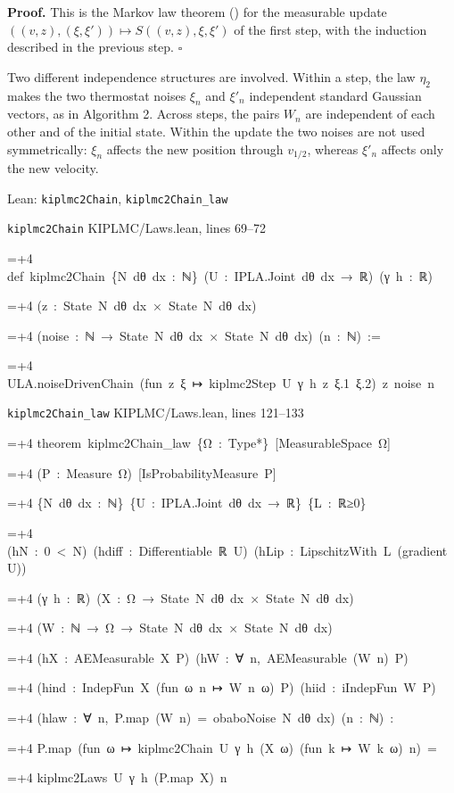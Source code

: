 \documentclass[11pt,a4paper]{article}
\newlength{\leancharwidth}
\newenvironment{leancode}{\par\smallskip\begingroup\ttfamily\footnotesize\raggedright
  \settowidth{\leancharwidth}{M}\setlength{\parskip}{0pt}\setlength{\parindent}{0pt}
  \frenchspacing}{\par\endgroup\smallskip}
\newcommand{\leanline}[2]{\hangindent=\dimexpr#1\leancharwidth+4\leancharwidth\relax
  \hangafter=1\noindent\hspace*{#1\leancharwidth}#2\par}
\newcommand{\leansource}[1]{\par{\footnotesize\color{leanmuted}#1}\par}
\begin{document}
\textbf{Proof.} This is the Markov law theorem (\cite[Section~3.33.12]{LangevinLean2026ULASC}) for the measurable update \(((v,z),(\xi,\xi'))\mapsto S((v,z),\xi,\xi')\) of the first step, with the induction described in the previous step. \(\square\)




Two different independence structures are involved. Within a step, the law \(\eta_2\) makes the two thermostat noises \(\xi_n\) and \(\xi'_n\) independent standard Gaussian vectors, as in Algorithm 2. Across steps, the pairs \(W_n\) are independent of each other and of the initial state. Within the update the two noises are not used symmetrically: \(\xi_n\) affects the new position through \(v_{1/2}\), whereas \(\xi'_n\) affects only the new velocity.

\begin{leanbox}{Lean: \texttt{kiplmc2Chain}, \texttt{kiplmc2Chain\_\allowbreak{}law}}
\leansource{\texttt{kiplmc2Chain} \quad KIPLMC/\allowbreak{}Laws.lean, lines 69–72}
\begin{leancode}
\leanline{0}{def\ kiplmc2Chain\ \{N\ dθ\ dx\ :\ ℕ\}\ (U\ :\ IPLA.Joint\ dθ\ dx\ →\ ℝ)\ (γ\ h\ :\ ℝ)}
\leanline{4}{(z\ :\ State\ N\ dθ\ dx\ ×\ State\ N\ dθ\ dx)}
\leanline{4}{(noise\ :\ ℕ\ →\ State\ N\ dθ\ dx\ ×\ State\ N\ dθ\ dx)\ (n\ :\ ℕ)\ :=}
\leanline{2}{ULA.noiseDrivenChain\ (fun\ z\ ξ\ ↦\ kiplmc2Step\ U\ γ\ h\ z\ ξ.1\ ξ.2)\ z\ noise\ n}
\end{leancode}
\leansource{\texttt{kiplmc2Chain\_\allowbreak{}law} \quad KIPLMC/\allowbreak{}Laws.lean, lines 121–133}
\begin{leancode}
\leanline{0}{theorem\ kiplmc2Chain\_law\ \{Ω\ :\ Type*\}\ [MeasurableSpace\ Ω]}
\leanline{4}{(P\ :\ Measure\ Ω)\ [IsProbabilityMeasure\ P]}
\leanline{4}{\{N\ dθ\ dx\ :\ ℕ\}\ \{U\ :\ IPLA.Joint\ dθ\ dx\ →\ ℝ\}\ \{L\ :\ ℝ≥0\}}
\leanline{4}{(hN\ :\ 0\ <\ N)\ (hdiff\ :\ Differentiable\ ℝ\ U)\ (hLip\ :\ LipschitzWith\ L\ (gradient\ U))}
\leanline{4}{(γ\ h\ :\ ℝ)\ (X\ :\ Ω\ →\ State\ N\ dθ\ dx\ ×\ State\ N\ dθ\ dx)}
\leanline{4}{(W\ :\ ℕ\ →\ Ω\ →\ State\ N\ dθ\ dx\ ×\ State\ N\ dθ\ dx)}
\leanline{4}{(hX\ :\ AEMeasurable\ X\ P)\ (hW\ :\ ∀\ n,\ AEMeasurable\ (W\ n)\ P)}
\leanline{4}{(hind\ :\ IndepFun\ X\ (fun\ ω\ n\ ↦\ W\ n\ ω)\ P)\ (hiid\ :\ iIndepFun\ W\ P)}
\leanline{4}{(hlaw\ :\ ∀\ n,\ P.map\ (W\ n)\ =\ obaboNoise\ N\ dθ\ dx)\ (n\ :\ ℕ)\ :}
\leanline{4}{P.map\ (fun\ ω\ ↦\ kiplmc2Chain\ U\ γ\ h\ (X\ ω)\ (fun\ k\ ↦\ W\ k\ ω)\ n)\ =}
\leanline{6}{kiplmc2Laws\ U\ γ\ h\ (P.map\ X)\ n}
\end{leancode}

\end{leanbox}
\end{document}
